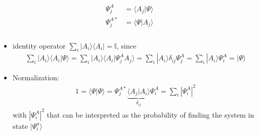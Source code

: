 \documentclass[letterpaper,10pt,english]{jupyterBook}
\begin{document}
\begin{equation*}
\begin{split}\begin{aligned}
  \Psi_j^A    & = \langle A_j  | \Psi \rangle \\
  \Psi_j^{A*} & = \langle \Psi | A_j \rangle \\
\end{aligned}\end{split}
\end{equation*}\begin{itemize}
\item {} 
\sphinxAtStartPar
identity operator \(\sum_i | A_i \rangle \langle A_i | = \mathbb{I}\), since
\begin{equation*}
\begin{split}\sum_i | A_i \rangle \langle A_i | \Psi \rangle = \sum_i | A_i \rangle \langle A_i | \Psi_j^A A_j \rangle =
  \sum_i | A_i \rangle \delta_{ij} \Psi_j^A = \sum_i | A_i \rangle  \Psi_i^A  = | \Psi \rangle\end{split}
\end{equation*}
\item {} 
\sphinxAtStartPar
Normalization:
\begin{equation*}
\begin{split}1 =\langle \Psi | \Psi \rangle = \Psi_j^{A*} \underbrace{\langle A_j | A_i \rangle}_{\delta_{ij}} \Psi_i^{A} = \sum_i \left| \Psi_i^A \right|^2\end{split}
\end{equation*}
\sphinxAtStartPar
with \(|\Psi_i^A|^2\) that can be interpreted as the probability of finding the system in state \(|\Psi_i^a\rangle\)


\end{itemize}
\end{document}
